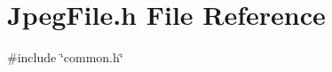 \section{Jpeg\+File.\+h File Reference}
\label{JpegFile_8h}
{\ttfamily \#include \char`\"{}common.\+h\char`\"{}}\newline
